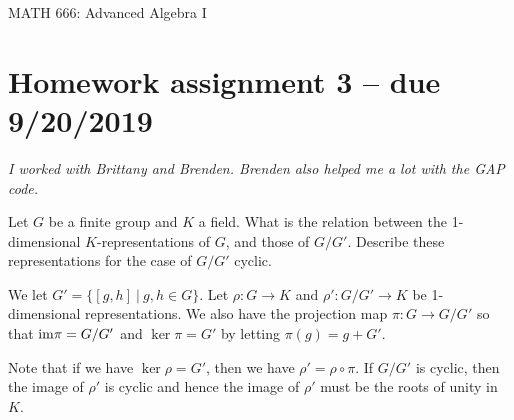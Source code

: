 \documentclass[leqno]{article}
\author{Colin Roberts}
\begin{document}
\begin{center}
  \begin{huge}
    MATH 666: Advanced Algebra I
  \end{huge}
\end{center}

\section*{Homework assignment 3 -- due 9/20/2019}
\noindent \emph{I worked with Brittany and Brenden.  Brenden also helped me a lot with the GAP code.}
\setcounter{problem}{9}
\begin{problem}
Let $G$ be a finite group and $K$ a field. What is the relation between the 1-dimensional $K$-representations of $G$, and those of $G/G'$. Describe these representations for the case of $G/G'$ cyclic.
\end{problem}
\begin{solution}
We let $G'=\{[g,h]~\vert~ g,h\in G\}$.  Let $\rho \colon G \to K$ and $\rho'\colon G/G' \to K$ be 1-dimensional representations. We also have the projection map $\pi \colon G \to G/G'$ so that $\mathrm{im} \pi = G/G'$ and $\ker \pi = G'$ by letting $\pi(g)=g+G'$. 

Note that if we have $\ker \rho = G'$, then we have $\rho'=\rho \circ \pi$.  If $G/G'$ is cyclic, then the image of $\rho'$ is cyclic and hence the image of $\rho'$ must be the roots of unity in $K$.
\end{solution}
\end{document}

